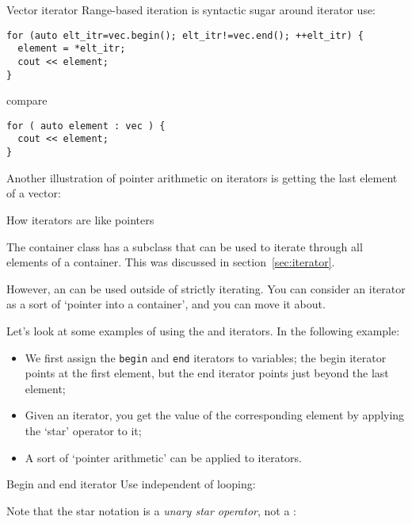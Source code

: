 \begin{slide}{Vector iterator}
  \label{sl:iterate-vector}
  Range-based iteration is syntactic sugar around
  iterator use:
\begin{lstlisting}
for (auto elt_itr=vec.begin(); elt_itr!=vec.end(); ++elt_itr) {
  element = *elt_itr;
  cout << element;
}
\end{lstlisting}
compare
\begin{lstlisting}
for ( auto element : vec ) {
  cout << element;
}
\end{lstlisting}
\end{slide}

Another illustration of pointer arithmetic on iterators is getting the
last element of a vector:
%

 {How iterators are like pointers}
\label{sec:iterator-class}

The container class has a subclass  that can be
used to iterate through all elements of a container. This was
discussed in section~\ref{sec:iterator}.

However, an  can be used outside of strictly iterating.
You can consider an iterator as a sort of `pointer into a container',
and you can move it about.

Let's look at some examples of using
the  and  iterators.
In the following example:
\begin{itemize}
\item We first assign the \lstinline{begin} and \lstinline{end} iterators to variables;
  the begin iterator points at the first element,
  but the end iterator points just beyond the last element;
\item Given an iterator, you get the value of the corresponding element by
  applying the `star' operator to it;
\item A sort of `pointer arithmetic' can be applied to iterators.
\end{itemize}

\begin{block}{Begin and end iterator}
  \label{sl:vec-iterator}
  Use independent of looping:
\end{block}

Note that the star notation is a
\emph{unary star operator},
not a
:
%

